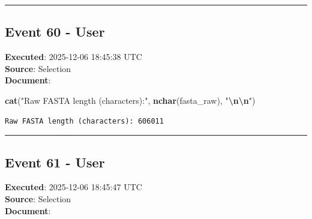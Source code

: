 \documentclass[
  11pt,
]{article}
\newenvironment{Shaded}{\begin{snugshade}}{\end{snugshade}}
\newcommand{\FunctionTok}[1]{\textcolor[rgb]{0.13,0.29,0.53}{\textbf{#1}}}
\newcommand{\NormalTok}[1]{#1}
\newcommand{\SpecialCharTok}[1]{\textcolor[rgb]{0.81,0.36,0.00}{\textbf{#1}}}
\newcommand{\StringTok}[1]{\textcolor[rgb]{0.31,0.60,0.02}{#1}}
\newenvironment{rpoutput}{\vspace{0.5em}\begin{snugshade}}{\end{snugshade}}
\begin{document}
\begin{center}\rule{0.5\linewidth}{0.5pt}\end{center}

\subsection{Event 60 - User}\label{event-60---user}

\textbf{Executed}: 2025-12-06 18:45:38 UTC\\
\textbf{Source}: Selection\\
\textbf{Document}:

\begin{Shaded}
\begin{Highlighting}[]
\FunctionTok{cat}\NormalTok{(}\StringTok{"Raw FASTA length (characters):"}\NormalTok{, }\FunctionTok{nchar}\NormalTok{(fasta\_raw), }\StringTok{"}\SpecialCharTok{\textbackslash{}n\textbackslash{}n}\StringTok{"}\NormalTok{)}
\end{Highlighting}
\end{Shaded}

\begin{rpoutput}

\begin{verbatim}
Raw FASTA length (characters): 606011 
\end{verbatim}

\end{rpoutput}

\begin{center}\rule{0.5\linewidth}{0.5pt}\end{center}

\subsection{Event 61 - User}\label{event-61---user}

\textbf{Executed}: 2025-12-06 18:45:47 UTC\\
\textbf{Source}: Selection\\
\textbf{Document}:
\end{document}
